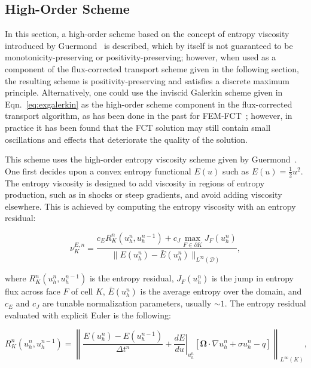 \subsection{High-Order Scheme}\label{sec:highorder}

In this section, a high-order scheme based on the concept of entropy
viscosity introduced by Guermond~\cite{guermond_ev} is described, which by itself
is not guaranteed to be monotonicity-preserving or positivity-preserving;
however, when used as a component of the flux-corrected transport scheme given in
the following section, the resulting scheme is positivity-preserving
and satisfies a discrete maximum principle. Alternatively, one could use
the inviscid Galerkin scheme given in Eqn.~\ref{eq:exgalerkin} as
the high-order scheme component in the flux-corrected transport algorithm,
as has been done in the past for FEM-FCT~\cite{kuzmin_book}; however,
in practice it has been found that the FCT solution may still
contain small oscillations and effects that deteriorate the quality of the solution.

This scheme uses the high-order entropy viscosity scheme given by
Guermond~\cite{guermond_secondorder}.
One first decides upon a convex entropy functional $E(u)$ such as $E(u)=\frac{1}{2}u^2$.
The entropy viscosity is designed to add viscosity in regions of entropy
production, such as in shocks or steep gradients, and avoid adding
viscosity elsewhere. This is achieved by computing the entropy viscosity
with an entropy residual:

\begin{equation}
   \nu^{E,n}_K = \frac{c_E R_K^n(u_h^n,u_h^{n-1})
      + c_J\max\limits_{F\in\partial K}J_F(u_h^n)}
      {\|E(u_h^n)-\bar{E}(u_h^n)\|_{L^\infty(\mathcal{D})}},
\end{equation}

\noindent
where $R_K^n(u_h^n,u_h^{n-1})$ is the entropy residual, $J_F(u_h^n)$
is the jump in entropy flux across face $F$ of cell $K$, $\bar{E}(u_h^n)$ is the average
entropy over the domain, and $c_E$ and $c_J$ are tunable normalization
parameters, usually $\sim 1$.
The entropy residual evaluated with explicit Euler is the following:

\begin{equation}
    R_K^n(u_h^n,u_h^{n-1}) = \left\|\frac{E(u_h^n)-E(u_h^{n-1})}{\Delta t^n}
      + \left.\frac{dE}{du}\right|_{u_h^n}\left[\mathbf{\Omega}\cdot\nabla u_h^n
      + \sigma u_h^n
      - q \right]\right\|_{L^\infty(K)},
\end{equation}

